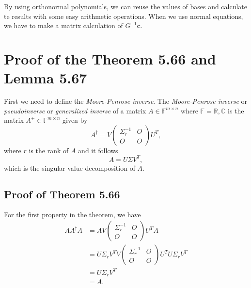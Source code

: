 \documentclass[a4paper]{article}
\begin{document}
By using orthonormal polynomials, we can reuse the values of bases and calculate te results with some easy arithmetic operations. When we use normal equations, we have to make a matrix calculation of $G^{-1} \mathbf{c}$.

\section{Proof of the Theorem 5.66 and Lemma 5.67}

First we need to define the \textit{Moore-Penrose inverse}. The \textit{Moore-Penrose inverse} or \textit{pseudoinverse} or \textit{generalized inverse} of a matrix $A \in \mathbb{F}^{m \times n}$ where $\mathbb{F} = \mathbb{R}, \mathbb{C}$ is the matrix $A^+ \in \mathbb{F}^{m \times n}$ given by 
\begin{equation}
    A^{\dagger} = V \begin{pmatrix} \Sigma_r^{-1} & O \\ O & O \end{pmatrix} U^T,
    \label{eq:5_pseudoinverse}
\end{equation}
where $r$ is the rank of $A$ and it follows
\begin{equation}
    A = U \Sigma V^T,
    \label{eq:5_svd}
\end{equation}
which is the singular value decomposition of $A$.

\subsection{Proof of Theorem 5.66}

For the first property in the theorem, we have
\begin{equation}
    \begin{aligned}
        A A^{\dagger} A &= AV \begin{pmatrix} \Sigma_r^{-1} & O \\ O & O \end{pmatrix} U^T A \\
        &= U \Sigma_r V^T V \begin{pmatrix} \Sigma_r^{-1} & O \\ O & O \end{pmatrix} U^T U \Sigma_r V^T \\
        &= U \Sigma_r V^T \\
        &= A.
    \end{aligned}
    \label{eq:5_property1}
\end{equation}
\end{document}
